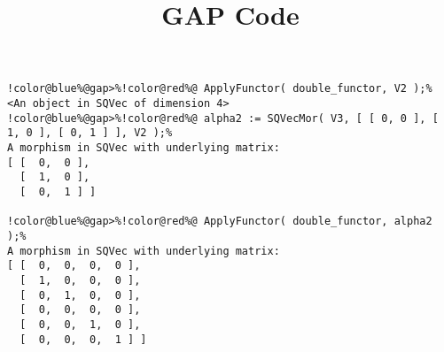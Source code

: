 \documentclass[12pt]{amsart}
\title{GAP Code}
\author{}
\begin{document}
\maketitle

\begin{Verbatim}[commandchars=!@\%,frame=single]
!color@blue%@gap>%!color@red%@ ApplyFunctor( double_functor, V2 );%
<An object in SQVec of dimension 4>
!color@blue%@gap>%!color@red%@ alpha2 := SQVecMor( V3, [ [ 0, 0 ], [ 1, 0 ], [ 0, 1 ] ], V2 );%
A morphism in SQVec with underlying matrix:
[ [  0,  0 ],
  [  1,  0 ],
  [  0,  1 ] ]

!color@blue%@gap>%!color@red%@ ApplyFunctor( double_functor, alpha2 );%
A morphism in SQVec with underlying matrix:
[ [  0,  0,  0,  0 ],
  [  1,  0,  0,  0 ],
  [  0,  1,  0,  0 ],
  [  0,  0,  0,  0 ],
  [  0,  0,  1,  0 ],
  [  0,  0,  0,  1 ] ]

\end{Verbatim}
\end{document}

